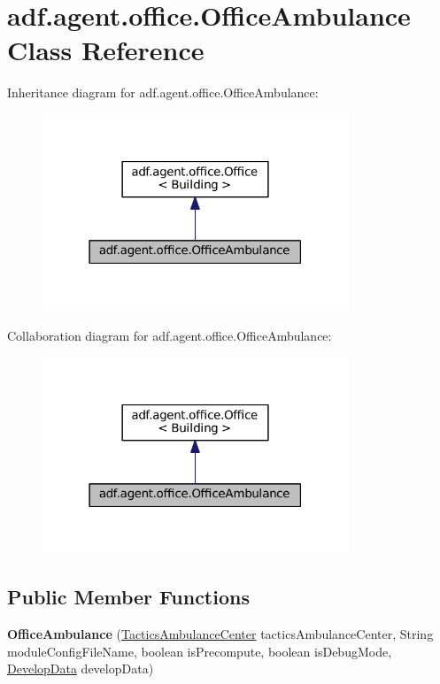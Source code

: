 \hypertarget{classadf_1_1agent_1_1office_1_1OfficeAmbulance}{}\section{adf.\+agent.\+office.\+Office\+Ambulance Class Reference}
\label{classadf_1_1agent_1_1office_1_1OfficeAmbulance}


Inheritance diagram for adf.\+agent.\+office.\+Office\+Ambulance\+:
\nopagebreak
\begin{figure}[H]
\begin{center}
\leavevmode
\includegraphics[width=259pt]{classadf_1_1agent_1_1office_1_1OfficeAmbulance__inherit__graph}
\end{center}
\end{figure}


Collaboration diagram for adf.\+agent.\+office.\+Office\+Ambulance\+:
\nopagebreak
\begin{figure}[H]
\begin{center}
\leavevmode
\includegraphics[width=259pt]{classadf_1_1agent_1_1office_1_1OfficeAmbulance__coll__graph}
\end{center}
\end{figure}
\subsection*{Public Member Functions}
\begin{DoxyCompactItemize}
\item 
\hypertarget{classadf_1_1agent_1_1office_1_1OfficeAmbulance_a1889be46f63d5cbe6eb76cd711f9dee4}{}\label{classadf_1_1agent_1_1office_1_1OfficeAmbulance_a1889be46f63d5cbe6eb76cd711f9dee4} 
{\bfseries Office\+Ambulance} (\hyperlink{classadf_1_1component_1_1tactics_1_1center_1_1TacticsAmbulanceCenter}{Tactics\+Ambulance\+Center} tactics\+Ambulance\+Center, String module\+Config\+File\+Name, boolean is\+Precompute, boolean is\+Debug\+Mode, \hyperlink{classadf_1_1agent_1_1develop_1_1DevelopData}{Develop\+Data} develop\+Data)
\end{DoxyCompactItemize}
